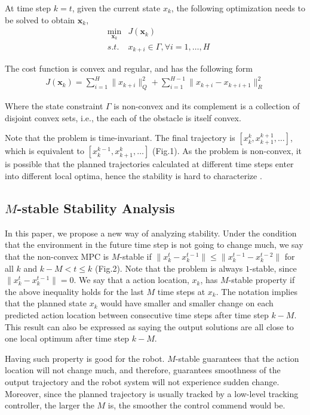 \documentclass{ifacconf}
\begin{document}
At time step $k=t$, given the current state $x_k$, the following optimization needs to be solved to obtain $\mathbf{x}_k$,
\begin{eqnarray}
&\min_{\mathbf{x}_{k}} & J(\mathbf{x}_k)\\
&s.t.& x_{k+i}\in\Gamma,\forall i=1,\ldots,H
\end{eqnarray}

\begin{assum}[Cost]
The cost function is convex and regular, and has the following form
\begin{eqnarray}
J(\mathbf{x}_k) = \sum_{i=1}^{H} \|x_{k+i}\|_{Q}^2 + \sum_{i=1}^{H-1} \|x_{k+i}-x_{k+i+1}\|_R^2
\end{eqnarray}
\end{assum}

\begin{assum}[Constraint]
Where the state constraint $\Gamma$ is non-convex and its complement is a collection of disjoint convex sets, i.e., the each of the obstacle is itself convex.
\end{assum}

Note that the problem is time-invariant. The final trajectory is $[x_k^k,x_{k+1}^{k+1},\ldots]$, which is equivalent to $[x_{k}^{k-1},x_{k+1}^{k},\ldots]$ (Fig.1). As the problem is non-convex, it is possible that the planned trajectories calculated at different time steps enter into different local optima, hence the stability is hard to characterize . 

\subsection{$M$-stable Stability Analysis}
In this paper, we propose a new way of analyzing stability. Under the condition that the environment in the future time step is not going to change much, we say that the non-convex MPC is $M$-stable if $\|x_{k}^t-x_k^{t-1}\|\leq \|x_k^{t-1}-x_k^{t-2}\|$ for all $k$ and $k-M< t\leq k$ (Fig.2). Note that the problem is always $1$-stable, since $\|x_{k}^t-x_k^{t-1}\|=0$. We say that a action location, $x_{k}$, has $M$-stable property if the above inequality holds for the last $M$ time steps at $x_{k}$.  The notation implies that the planned state $x_k$ would have smaller and smaller change on each predicted action location between consecutive time steps after time step $k-M$. This result can also be expressed as saying the output solutions are all close to one local optimum after time step $k-M$. 

Having such property is good for the robot. $M$-stable guarantees that the action location will not change much, and therefore, guarantees smoothness of the output trajectory and the robot system will not experience sudden change. Moreover, since the planned trajectory is usually tracked by a low-level tracking controller, the larger the $M$ is, the smoother the control commend would be.
\end{document}
